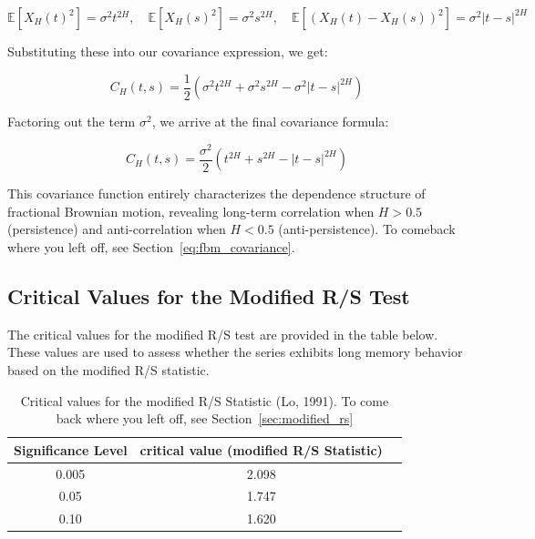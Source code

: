 \documentclass[11pt]{extarticle}
\begin{document}
\[
\mathbb{E}[X_H(t)^2] = \sigma^2 t^{2H}, \quad \mathbb{E}[X_H(s)^2] = \sigma^2 s^{2H}, \quad \mathbb{E}[(X_H(t)-X_H(s))^2] = \sigma^2 |t-s|^{2H}
\]

Substituting these into our covariance expression, we get:

\[
C_H(t,s) = \frac{1}{2}\left(\sigma^2 t^{2H} + \sigma^2 s^{2H} - \sigma^2 |t-s|^{2H}\right)
\]


Factoring out the term \( \sigma^2 \), we arrive at the final covariance formula:

\[
\boxed{C_H(t,s) = \frac{\sigma^2}{2}\left(t^{2H} + s^{2H} - |t-s|^{2H}\right)}
\]

This covariance function entirely characterizes the dependence structure of fractional Brownian motion, revealing long-term correlation when \(H>0.5\) (persistence) and anti-correlation when \(H<0.5\) (anti-persistence).
To comeback where you left off, see Section~\ref{eq:fbm_covariance}. \\

\subsection{Critical Values for the Modified R/S Test}

The critical values for the modified R/S test are provided in the table below. These values are used to assess whether the series exhibits long memory behavior based on the modified R/S statistic.

\begin{table}[ht!]
\centering
\begin{tabular}{|c|c|c|}
\hline
\textbf{Significance Level} & \textbf{critical value (modified R/S Statistic)} \\
\hline
0.005 & 2.098\\
0.05 & 1.747\\
0.10 & 1.620\\

\hline
\end{tabular}
\caption{Critical values for the modified R/S Statistic (Lo, 1991). To come back where you left off, see Section~\ref{sec:modified_rs}}
    \label{table:critical_values}
\end{table}
\end{document}
